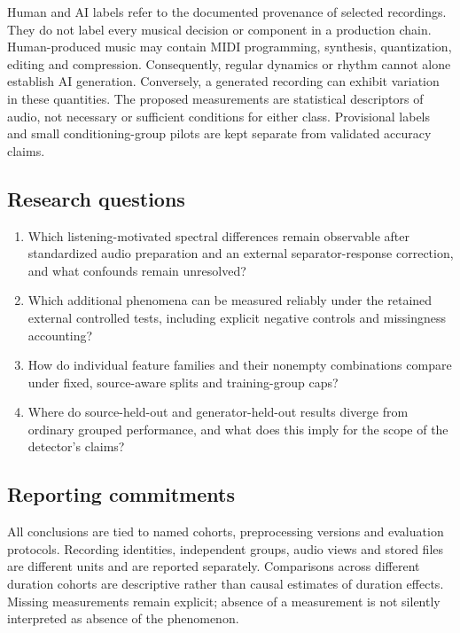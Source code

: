 Human and AI labels refer to the documented provenance of selected recordings.
They do not label every musical decision or component in a production chain.
Human-produced music may contain MIDI programming, synthesis, quantization,
editing and compression. Consequently, regular dynamics or rhythm cannot
alone establish AI generation. Conversely, a generated recording can exhibit
variation in these quantities. The proposed measurements are statistical
descriptors of audio, not necessary or sufficient conditions for either class.
Provisional labels and small conditioning-group pilots are kept separate from
validated accuracy claims.

\subsection{Research questions}

\begin{enumerate}
\item Which listening-motivated spectral differences remain observable after
      standardized audio preparation and an external separator-response
      correction, and what confounds remain unresolved?
\item Which additional phenomena can be measured reliably under the retained
      external controlled tests, including explicit negative controls and
      missingness accounting?
\item How do individual feature families and their nonempty combinations
      compare under fixed, source-aware splits and training-group caps?
\item Where do source-held-out and generator-held-out results diverge from
      ordinary grouped performance, and what does this imply for the scope
      of the detector's claims?
\end{enumerate}

\subsection{Reporting commitments}

All conclusions are tied to named cohorts, preprocessing versions and
evaluation protocols. Recording identities, independent groups, audio views
and stored files are different units and are reported separately. Comparisons
across different duration cohorts are descriptive rather than causal estimates
of duration effects. Missing measurements remain explicit; absence of a
measurement is not silently interpreted as absence of the phenomenon.

